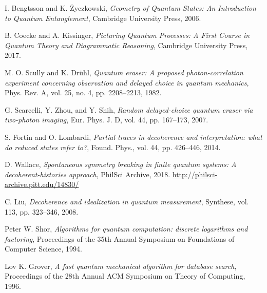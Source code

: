 \documentclass[12pt]{article}
\begin{document}
\begin{thebibliography}{999}
I. Bengtsson and K. Życzkowski,
\textit{Geometry of Quantum States: An Introduction to Quantum Entanglement},
Cambridge University Press, 2006.

B. Coecke and A. Kissinger,
\textit{Picturing Quantum Processes: A First Course in Quantum Theory and Diagrammatic Reasoning},
Cambridge University Press, 2017.

M. O. Scully and K. Drühl,
\textit{Quantum eraser: A proposed photon-correlation experiment concerning observation and delayed choice in quantum mechanics},
Phys. Rev. A, vol. 25, no. 4, pp. 2208–2213, 1982.

G. Scarcelli, Y. Zhou, and Y. Shih,
\textit{Random delayed-choice quantum eraser via two-photon imaging},
Eur. Phys. J. D, vol. 44, pp. 167–173, 2007.

S. Fortin and O. Lombardi,
\textit{Partial traces in decoherence and interpretation: what do reduced states refer to?},
Found. Phys., vol. 44, pp. 426–446, 2014.

D. Wallace,
\textit{Spontaneous symmetry breaking in finite quantum systems: A decoherent-histories approach},
PhilSci Archive, 2018. \url{http://philsci-archive.pitt.edu/14830/}

C. Liu,
\textit{Decoherence and idealization in quantum measurement},
Synthese, vol. 113, pp. 323–346, 2008.

Peter W. Shor,
\textit{Algorithms for quantum computation: discrete logarithms and factoring},
Proceedings of the 35th Annual Symposium on Foundations of Computer Science, 1994.

Lov K. Grover,
\textit{A fast quantum mechanical algorithm for database search},
Proceedings of the 28th Annual ACM Symposium on Theory of Computing, 1996.

\end{thebibliography}
\end{document}
